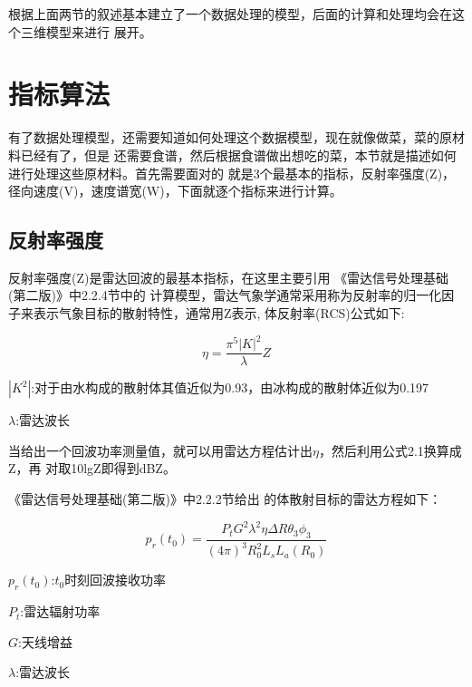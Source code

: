 \documentclass[a4paper,12pt]{report}
\begin{document}
\begin{spacing}{1.5}
根据上面两节的叙述基本建立了一个数据处理的模型，后面的计算和处理均会在这个三维模型来进行
展开。

\section{指标算法}
有了数据处理模型，还需要知道如何处理这个数据模型，现在就像做菜，菜的原材料已经有了，但是
还需要食谱，然后根据食谱做出想吃的菜，本节就是描述如何进行处理这些原材料。首先需要面对的
就是3个最基本的指标，反射率强度(Z)，径向速度(V)，速度谱宽(W)，下面就逐个指标来进行计算。

\subsection{反射率强度}
反射率强度(Z)是雷达回波的最基本指标，在这里主要引用
《雷达信号处理基础(第二版)》\cite{FundamentalsOfRadarSignalProcessing}中2.2.4节中的
计算模型，雷达气象学通常采用称为反射率的归一化因子来表示气象目标的散射特性，通常用Z表示,
体反射率(RCS)公式如下:

\begin{proposition}[体反射率]

    \begin{equation}
        \eta=\frac{\pi^5|K|^2}{\lambda}Z
    \end{equation}

    $|K^2|$:对于由水构成的散射体其值近似为0.93，由冰构成的散射体近似为0.197

    $\lambda$:雷达波长

\end{proposition}

当给出一个回波功率测量值，就可以用雷达方程估计出$\eta$，然后利用公式2.1换算成Z，再
对取10lgZ即得到dBZ。

《雷达信号处理基础(第二版)》\cite{FundamentalsOfRadarSignalProcessing}中2.2.2节给出
的体散射目标的雷达方程如下：
\begin{proposition}[体散射雷达方程]

    \begin{equation}
        p_r\left(t_0\right)=\frac{P_tG^2\lambda^2\eta\Delta R\theta_3\phi_3}{
                            \left(4\pi\right)^3R_0^2L_sL_a\left(R_0\right)}
    \end{equation}

    $p_r(t_0)$:$t_0$时刻回波接收功率

    $P_t$:雷达辐射功率

    $G$:天线增益

    $\lambda$:雷达波长


\end{proposition}
\end{spacing}
\end{document}
